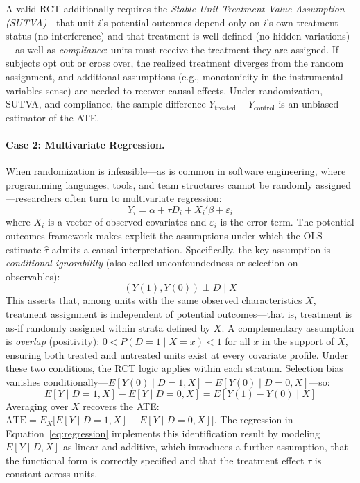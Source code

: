 A valid RCT additionally requires the \emph{Stable Unit Treatment Value Assumption (SUTVA)}---that unit $i$'s potential outcomes depend only on $i$'s own treatment status (no interference) and that treatment is well-defined (no hidden variations)---as well as \emph{compliance}: units must receive the treatment they are assigned.
If subjects opt out or cross over, the realized treatment diverges from the random assignment, and additional assumptions (e.g., monotonicity in the instrumental variables sense) are needed to recover causal effects.
Under randomization, SUTVA, and compliance, the sample difference $\bar{Y}_{\text{treated}} - \bar{Y}_{\text{control}}$ is an unbiased estimator of the ATE.

\paragraph{Case 2: Multivariate Regression.}
When randomization is infeasible---as is common in software engineering, where programming languages, tools, and team structures cannot be randomly assigned---researchers often turn to multivariate regression:
\begin{equation}
    Y_i = \alpha + \tau D_i + X_i' \beta + \varepsilon_i
    \label{eq:regression}
\end{equation}
where $X_i$ is a vector of observed covariates and $\varepsilon_i$ is the error term.
The potential outcomes framework makes explicit the assumptions under which the OLS estimate $\hat{\tau}$ admits a causal interpretation.
Specifically, the key assumption is \emph{conditional ignorability} (also called unconfoundedness or selection on observables):
\begin{equation}
    (Y(1), Y(0)) \perp D \mid X
    \label{eq:cond-ignorability}
\end{equation}
This asserts that, among units with the same observed characteristics $X$, treatment assignment is independent of potential outcomes---that is, treatment is as-if randomly assigned within strata defined by $X$.
A complementary assumption is \emph{overlap} (positivity): $0 < P(D=1 \mid X=x) < 1$ for all $x$ in the support of $X$, ensuring both treated and untreated units exist at every covariate profile.
Under these two conditions, the RCT logic applies within each stratum.
Selection bias vanishes conditionally---$E[Y(0) \mid D=1, X] = E[Y(0) \mid D=0, X]$---so:
\begin{equation}
    E[Y \mid D=1, X] - E[Y \mid D=0, X] = E[Y(1) - Y(0) \mid X]
\end{equation}
Averaging over $X$ recovers the ATE: $\text{ATE} = E_X\!\big[E[Y \mid D\!=\!1, X] - E[Y \mid D\!=\!0, X]\big]$.
The regression in Equation~\eqref{eq:regression} implements this identification result by modeling $E[Y \mid D, X]$ as linear and additive, which introduces a further assumption, that the functional form is correctly specified and that the treatment effect $\tau$ is constant across units.

